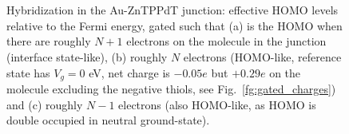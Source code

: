 \documentclass[aip,jcp,a4paper,reprint,floatfix,superscriptaddress]{revtex4-1}
\begin{document}
\begin{figure}
 \\
  \\

\caption{Hybridization in the Au-ZnTPPdT junction: effective HOMO levels relative to the Fermi energy, gated such that (a) is the HOMO when there are roughly $N+1$ electrons on the molecule in the junction (interface state-like), (b) roughly $N$ electrons (HOMO-like, reference state has $V_g=0$ eV, net charge is $-0.05e$ but $+0.29e$ on the molecule excluding the negative thiols, see Fig.~\ref{fg:gated_charges}) and (c) roughly $N-1$ electrons (also HOMO-like, as HOMO is double occupied in neutral ground-state).}\label{fragment-hybridization}
\end{figure}
\end{document}

